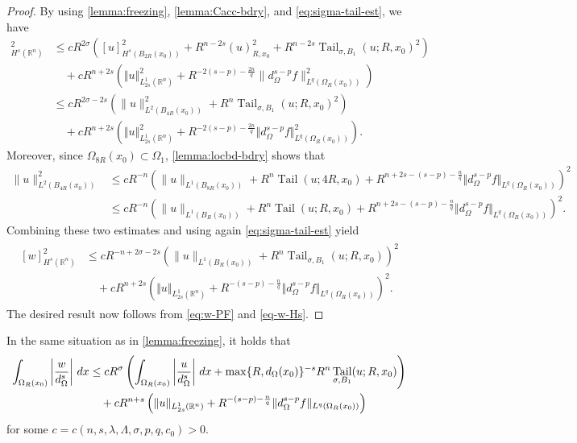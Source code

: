 \documentclass[11pt,reqno]{amsart}
\theoremstyle{plain}
\theoremstyle{definition}
\numberwithin{equation}{section}
\newcommand{\R}{\mathbb{R}}
\newcommand{\1}{\mathbbm{1}}
\DeclareMathOperator{\tail}{Tail}
\renewcommand{\d}{\textnormal{\,d}}
\begin{document}
\begin{proof}
By using \autoref{lemma:freezing}, \autoref{lemma:Cacc-bdry}, and \eqref{eq:sigma-tail-est}, we have
\begin{align*}
[w]_{H^s(\R^n)}^2
&\le c R^{2\sigma} \left( [u]_{H^s(B_{2R}(x_0))}^2 + R^{n-2s} (u)_{R, x_0}^2 + R^{n-2s} \tail_{\sigma,B_1}(u;R,x_0)^2 \right) \\
&\quad + c R^{n + 2s} \left(\Vert u \Vert_{L^1_{2s}(\R^n)}^2 + R^{-2(s - p) - \frac{2n}{q}} \| d_{\Omega}^{s-p} f \|_{L^q(\Omega_R(x_0))}^2 \right) \\
&\le c R^{2\sigma-2s} \left( \|u\|_{L^2(B_{4R}(x_0))}^2 + R^n \tail_{\sigma,B_1}(u; R, x_0)^2 \right) \\
&\quad + c R^{n + 2s} \left( \Vert u \Vert_{L^1_{2s}(\R^n)}^2 + R^{-2(s - p) - \frac{2n}{q}} \Vert d^{s-p}_{\Omega} f \Vert_{L^q(\Omega_R(x_0))}^2 \right).
\end{align*}
Moreover, since $\Omega_{8R}(x_0) \subset \Omega_1$, \autoref{lemma:locbd-bdry} shows that
\begin{align*}
\|u\|_{L^2(B_{4R}(x_0))}^2
&\leq c R^{-n} \left( \|u\|_{L^1(B_{8R}(x_0))} + R^n \tail(u;4R,x_0) + R^{n+2s - (s-p) - \frac{n}{q}} \Vert d_\Omega^{s-p}f \Vert_{L^q(\Omega_R(x_0))} \right)^2 \\
&\leq c R^{-n} \left( \|u\|_{L^1(B_{R}(x_0))} + R^n \tail(u;R,x_0) + R^{n+2s -(s-p) - \frac{n}{q}} \Vert d_\Omega^{s-p}f \Vert_{L^q(\Omega_R(x_0))} \right)^2.
\end{align*}
Combining these two estimates and using again \eqref{eq:sigma-tail-est} yield
\begin{align}\label{eq-w-Hs}
\begin{split}
    [w]_{H^s(\R^n)}^2
    &\le c R^{-n+2\sigma-2s} \left( \|u\|_{L^1(B_R(x_0))} + R^{n} \tail_{\sigma,B_1}(u; R,x_0) \right)^2 \\
    &\quad + cR^{n + 2s} \left( \Vert u \Vert_{L^1_{2s}(\R^n)} + R^{-(s-p) - \frac{n}{q}} \Vert d^{s-p}_{\Omega} f \Vert_{L^q(\Omega_{R}(x_0))} \right)^2.
\end{split}
\end{align}
The desired result now follows from \eqref{eq:w-PF} and \eqref{eq-w-Hs}.
\end{proof}

\begin{lemma}
\label{lemma:freezing-ds}
In the same situation as in \autoref{lemma:freezing}, it holds that
\begin{align}
\label{eq:ds-w-estimate}
\begin{split}
\int_{\Omega_R(x_0)} \left| \frac{w}{d_{\Omega}^s} \right| \d x
&\le c R^{\sigma} \left( \int_{\Omega_R(x_0)} \left|\frac{u}{d_{\Omega}^s} \right| \d x  +  \max\{R,d_{\Omega}(x_0)\}^{-s} R^{n} \tail_{\sigma,B_1}(u;R,x_0) \right)\\
&\quad + cR^{n + s} \left( \Vert u \Vert_{L^1_{2s}(\R^n)} + R^{-(s-p) - \frac{n}{q}} \Vert d_{\Omega}^{s-p} f \Vert_{L^q(\Omega_{R}(x_0))} \right)
\end{split}
\end{align}
for some $c=c(n, s, \lambda, \Lambda, \sigma, p, q, c_0)>0$.
\end{lemma}
\end{document}
